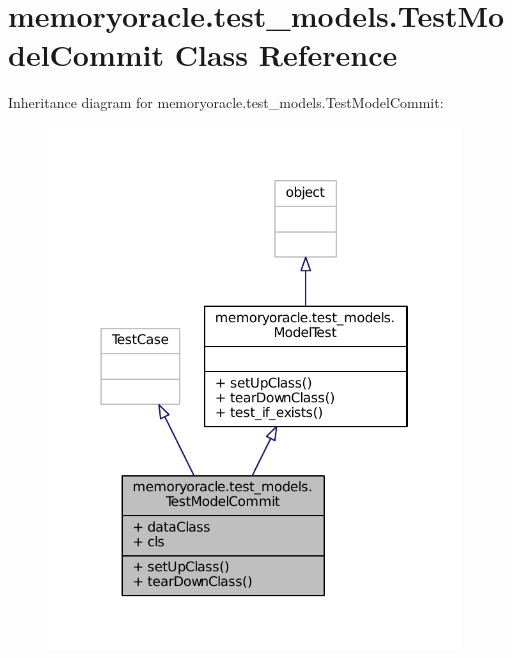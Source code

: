 \hypertarget{classmemoryoracle_1_1test__models_1_1TestModelCommit}{}\section{memoryoracle.\+test\+\_\+models.\+Test\+Model\+Commit Class Reference}
\label{classmemoryoracle_1_1test__models_1_1TestModelCommit}


Inheritance diagram for memoryoracle.\+test\+\_\+models.\+Test\+Model\+Commit\+:\nopagebreak
\begin{figure}[H]
\begin{center}
\leavevmode
\includegraphics[width=310pt]{classmemoryoracle_1_1test__models_1_1TestModelCommit__inherit__graph}
\end{center}
\end{figure}


